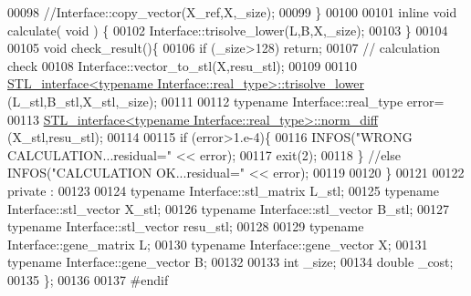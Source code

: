\begin{DoxyCode}
00098     \textcolor{comment}{//Interface::copy\_vector(X\_ref,X,\_size);}
00099   \}
00100 
00101   \textcolor{keyword}{inline} \textcolor{keywordtype}{void} calculate( \textcolor{keywordtype}{void} ) \{
00102       Interface::trisolve\_lower(L,B,X,\_size);
00103   \}
00104 
00105   \textcolor{keywordtype}{void} check\_result()\{
00106     \textcolor{keywordflow}{if} (\_size>128) \textcolor{keywordflow}{return};
00107     \textcolor{comment}{// calculation check}
00108     Interface::vector\_to\_stl(X,resu\_stl);
00109 
00110     \hyperlink{class_s_t_l__interface}{STL\_interface<typename Interface::real\_type>::trisolve\_lower}
      (L\_stl,B\_stl,X\_stl,\_size);
00111 
00112     \textcolor{keyword}{typename} Interface::real\_type error=
00113       \hyperlink{class_s_t_l__interface}{STL\_interface<typename Interface::real\_type>::norm\_diff}
      (X\_stl,resu\_stl);
00114 
00115     \textcolor{keywordflow}{if} (error>1.e-4)\{
00116       INFOS(\textcolor{stringliteral}{"WRONG CALCULATION...residual="} << error);
00117       exit(2);
00118     \} \textcolor{comment}{//else INFOS("CALCULATION OK...residual=" << error);}
00119 
00120   \}
00121 
00122 private :
00123 
00124   \textcolor{keyword}{typename} Interface::stl\_matrix L\_stl;
00125   \textcolor{keyword}{typename} Interface::stl\_vector X\_stl;
00126   \textcolor{keyword}{typename} Interface::stl\_vector B\_stl;
00127   \textcolor{keyword}{typename} Interface::stl\_vector resu\_stl;
00128 
00129   \textcolor{keyword}{typename} Interface::gene\_matrix L;
00130   \textcolor{keyword}{typename} Interface::gene\_vector X;
00131   \textcolor{keyword}{typename} Interface::gene\_vector B;
00132 
00133   \textcolor{keywordtype}{int} \_size;
00134   \textcolor{keywordtype}{double} \_cost;
00135 \};
00136 
00137 \textcolor{preprocessor}{#endif}
\end{DoxyCode}
